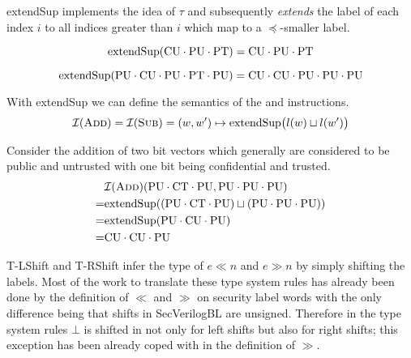 extendSup implements the idea of $ \tau $ and subsequently \textit{extends} the label of each index $ i $ to all indices greater than $ i $ which map to a $ \preceq $-smaller label.

\begin{example}
    \begin{equation*}
        \text{extendSup}(\text{CU} \cdot
        \text{PU} \cdot \text{PT}) = \text{CU} \cdot \text{PU} \cdot \text{PT}
    \end{equation*}

    \begin{equation*}
        \text{extendSup}(\text{PU} \cdot \text{CU} \cdot \text{PU} \cdot \text{PT} \cdot \text{PU}) = \text{CU} \cdot \text{CU} \cdot \text{PU} \cdot \text{PU} \cdot \text{PU}
    \end{equation*}
\end{example}

With extendSup we can define the semantics of the  and  instructions.
\begin{equation*}
    \mathcal{I}(\textsc{Add}) = \mathcal{I}(\textsc{Sub}) = (w, w') \mapsto \text{extendSup}\big(l(w) \sqcup l(w') \big)
\end{equation*}

\begin{example}
    Consider the addition of two bit vectors which generally are considered to be public and untrusted with one bit being confidential and trusted.
    \begin{align*}
        & \mathcal{I}(\textsc{Add})(\text{PU} \cdot \text{CT} \cdot \text{PU}, \text{PU} \cdot \text{PU} \cdot \text{PU}) \\
        =& \text{extendSup}((\text{PU} \cdot \text{CT} \cdot \text{PU}) \sqcup (\text{PU} \cdot \text{PU} \cdot \text{PU})) \\
        =& \text{extendSup}(\text{PU} \cdot \text{CU} \cdot \text{PU}) \\
        =& \text{CU} \cdot \text{CU} \cdot \text{PU}
    \end{align*}
\end{example}

T-LShift and T-RShift infer the type of $ e \ll n $ and $ e \gg n $ by simply shifting the labels.
Most of the work to translate these type system rules has already been done by the definition of $ \ll $ and $ \gg $ on security label words with the only difference being that shifts in SecVerilogBL are unsigned.
Therefore in the type system rules $ \bot $ is shifted in not only for left shifts but also for right shifts; this exception has been already coped with in the definition of $ \gg $.

